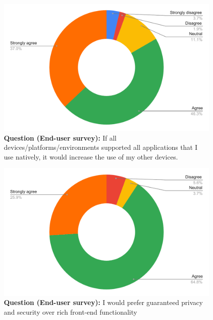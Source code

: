 \begin{figure}[H]
  \centering
  \includegraphics[width=13cm]{thesis/paper/images/p2u_q10.pdf}
  \textbf{Question (End-user survey):} If all devices/platforms/environments supported all applications that I use natively, it would increase the use of my other devices.
\end{figure}

\begin{figure}[H]
  \centering
  \includegraphics[width=13cm]{thesis/paper/images/p2u_q11.pdf}
  \textbf{Question (End-user survey):} I would prefer guaranteed privacy and security over rich front-end functionality
\end{figure}

